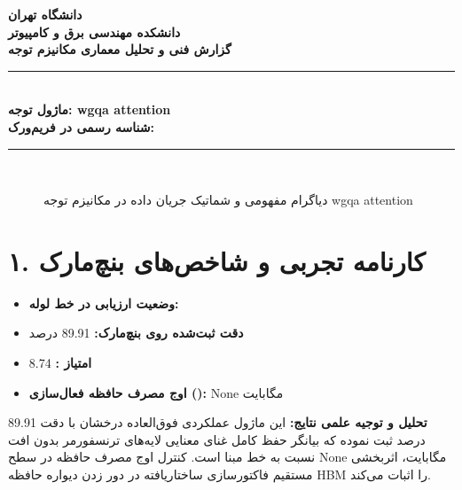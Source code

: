 \documentclass[12pt,a4paper]{article}
\begin{document}
\begin{center}
{\Large\bfseries دانشگاه تهران}\\[0.2cm]
{\large\bfseries دانشکده مهندسی برق و کامپیوتر}\\[0.2cm]
{\large\bfseries گزارش فنی و تحلیل معماری مکانیزم توجه}\\[0.5cm]
\rule{\linewidth}{1pt}\\[0.3cm]
{\LARGE\bfseries ماژول توجه: wgqa attention}\\[0.2cm]
{\large \textbf{شناسه رسمی در فریم‌ورک:} }\\[0.2cm]
\rule{\linewidth}{1pt}\\[0.5cm]
\end{center}

\begin{figure}[H]
\centering
{}
\caption{دیاگرام مفهومی و شماتیک جریان داده در مکانیزم توجه wgqa attention}
\end{figure}

\section*{۱. کارنامه تجربی و شاخص‌های بنچ‌مارک}
\begin{itemize}
\item \textbf{وضعیت ارزیابی در خط لوله:} 
\item \textbf{دقت ثبت‌شده روی بنچ‌مارک:} 89.91 درصد
\item \textbf{امتیاز :} 8.74
\item \textbf{اوج مصرف حافظه فعال‌سازی ():} None مگابایت
\end{itemize}
\textbf{تحلیل و توجیه علمی نتایج:} این ماژول عملکردی فوق‌العاده درخشان با دقت 89.91 درصد ثبت نموده که بیانگر حفظ کامل غنای معنایی لایه‌های ترنسفورمر بدون افت نسبت به خط مبنا است. کنترل اوج مصرف حافظه در سطح None مگابایت، اثربخشی مستقیم فاکتورسازی ساختاریافته در دور زدن دیواره حافظه HBM را اثبات می‌کند.
\end{document}
